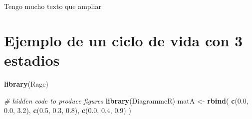 \documentclass[
]{book}
\newenvironment{Shaded}{\begin{snugshade}}{\end{snugshade}}
\newcommand{\CommentTok}[1]{\textcolor[rgb]{0.56,0.35,0.01}{\textit{#1}}}
\newcommand{\FloatTok}[1]{\textcolor[rgb]{0.00,0.00,0.81}{#1}}
\newcommand{\FunctionTok}[1]{\textcolor[rgb]{0.13,0.29,0.53}{\textbf{#1}}}
\newcommand{\NormalTok}[1]{#1}
\newcommand{\OtherTok}[1]{\textcolor[rgb]{0.56,0.35,0.01}{#1}}
\theoremstyle{definition}
\theoremstyle{definition}
\theoremstyle{definition}
\theoremstyle{definition}
\theoremstyle{remark}
\begin{document}
Tengo mucho texto que ampliar

\section{Ejemplo de un ciclo de vida con 3 estadios}\label{ejemplo-de-un-ciclo-de-vida-con-3-estadios}

\begin{Shaded}
\begin{Highlighting}[]
\FunctionTok{library}\NormalTok{(Rage)}
\end{Highlighting}
\end{Shaded}

\begin{Shaded}
\begin{Highlighting}[]
\CommentTok{\# hidden code to produce figures}
\FunctionTok{library}\NormalTok{(DiagrammeR)}
\NormalTok{matA }\OtherTok{\textless{}{-}} \FunctionTok{rbind}\NormalTok{(}
  \FunctionTok{c}\NormalTok{(}\FloatTok{0.0}\NormalTok{, }\FloatTok{0.0}\NormalTok{, }\FloatTok{3.2}\NormalTok{),}
  \FunctionTok{c}\NormalTok{(}\FloatTok{0.5}\NormalTok{, }\FloatTok{0.3}\NormalTok{, }\FloatTok{0.8}\NormalTok{),}
  \FunctionTok{c}\NormalTok{(}\FloatTok{0.0}\NormalTok{, }\FloatTok{0.4}\NormalTok{, }\FloatTok{0.9}\NormalTok{)}
\NormalTok{)}



\end{Highlighting}
\end{Shaded}
\end{document}
